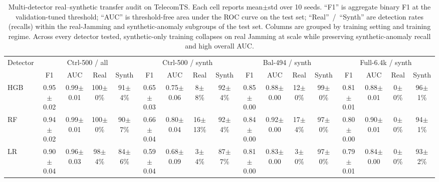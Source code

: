 \begin{table}[t]
  \caption{Multi-detector real--synthetic transfer audit on TelecomTS. Each cell reports mean$\pm$std over 10 seeds. ``F1'' is aggregate binary F1 at the validation-tuned threshold; ``AUC'' is threshold-free area under the ROC curve on the test set; ``Real''~/~``Synth'' are detection rates (recalls) within the real-Jamming and synthetic-anomaly subgroups of the test set. Columns are grouped by training setting and training regime. Across every detector tested, synthetic-only training collapses on real Jamming at scale while preserving synthetic-anomaly recall and high overall AUC.}
  \label{tab:e9_transfer}
  \scriptsize
  \setlength{\tabcolsep}{1.6pt}
  \begin{tabular}{@{}lcccccccccccccccc@{}}
    \toprule
    Detector & \multicolumn{4}{c}{Ctrl-500 / all} & \multicolumn{4}{c}{Ctrl-500 / synth} & \multicolumn{4}{c}{Bal-494 / synth} & \multicolumn{4}{c}{Full-6.4k / synth} \\
    \cmidrule(lr){2-5}\cmidrule(lr){6-9}\cmidrule(lr){10-13}\cmidrule(lr){14-17}
      & F1 & AUC & Real & Synth & F1 & AUC & Real & Synth & F1 & AUC & Real & Synth & F1 & AUC & Real & Synth \\
    \midrule
    HGB & 0.95{\scriptsize$\pm$0.02} & 0.99{\scriptsize$\pm$0.01} & 100{\scriptsize$\pm$0}\% & 91{\scriptsize$\pm$4}\% & 0.65{\scriptsize$\pm$0.03} & 0.75{\scriptsize$\pm$0.06} & 8{\scriptsize$\pm$8}\% & 92{\scriptsize$\pm$4}\% & 0.85{\scriptsize$\pm$0.00} & 0.88{\scriptsize$\pm$0.00} & 12{\scriptsize$\pm$0}\% & 99{\scriptsize$\pm$0}\% & 0.81{\scriptsize$\pm$0.01} & 0.88{\scriptsize$\pm$0.01} & 0{\scriptsize$\pm$0}\% & 96{\scriptsize$\pm$1}\% \\
    RF & 0.94{\scriptsize$\pm$0.02} & 0.99{\scriptsize$\pm$0.01} & 100{\scriptsize$\pm$0}\% & 90{\scriptsize$\pm$7}\% & 0.66{\scriptsize$\pm$0.04} & 0.80{\scriptsize$\pm$0.04} & 16{\scriptsize$\pm$13}\% & 92{\scriptsize$\pm$4}\% & 0.84{\scriptsize$\pm$0.00} & 0.92{\scriptsize$\pm$0.00} & 17{\scriptsize$\pm$4}\% & 97{\scriptsize$\pm$0}\% & 0.80{\scriptsize$\pm$0.00} & 0.90{\scriptsize$\pm$0.01} & 0{\scriptsize$\pm$0}\% & 94{\scriptsize$\pm$1}\% \\
    LR & 0.90{\scriptsize$\pm$0.04} & 0.96{\scriptsize$\pm$0.03} & 98{\scriptsize$\pm$4}\% & 84{\scriptsize$\pm$6}\% & 0.59{\scriptsize$\pm$0.04} & 0.68{\scriptsize$\pm$0.09} & 3{\scriptsize$\pm$4}\% & 87{\scriptsize$\pm$7}\% & 0.81{\scriptsize$\pm$0.00} & 0.83{\scriptsize$\pm$0.00} & 3{\scriptsize$\pm$0}\% & 97{\scriptsize$\pm$0}\% & 0.79{\scriptsize$\pm$0.01} & 0.84{\scriptsize$\pm$0.00} & 0{\scriptsize$\pm$0}\% & 93{\scriptsize$\pm$2}\% \\

\end{tabular}
\end{table}
